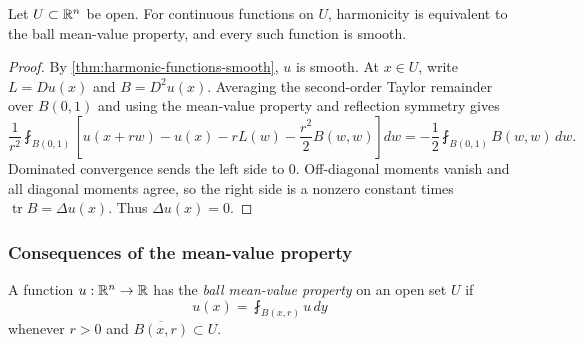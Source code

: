 \begin{theorem}
\label{thm:converse-mean-value-property-mvp}





Let $U\subset\mathbb{R}^n$ be open. For continuous functions on $U$, harmonicity is
equivalent to the ball mean-value property, and every such function is smooth.
\end{theorem}
\begin{proof}

\sketch By \cref{thm:harmonic-functions-smooth}, $u$ is smooth. At $x\in U$,
write $L=Du(x)$ and $B=D^2u(x)$. Averaging the second-order Taylor remainder
over $B(0,1)$ and using the mean-value property and reflection symmetry gives
$$\frac1{r^2}\fint_{B(0,1)}
\left[u(x+rw)-u(x)-rL(w)-\frac{r^2}{2}B(w,w)\right]dw
=-\frac12\fint_{B(0,1)}B(w,w)\,dw.$$
Dominated convergence sends the left side to $0$. Off-diagonal moments vanish
and all diagonal moments agree, so the right side is a nonzero constant times
$\operatorname{tr}B=\Delta u(x)$. Thus $\Delta u(x)=0$.
\end{proof}

\subsubsection{Consequences of the mean-value property}
\label{sec:laplace-mean-value-consequences}

\begin{definition}
\label{def:ball-mean-value-property}




A function $u:\mathbb{R}^n\to\mathbb{R}$ has the \emph{ball mean-value property} on an open
set $U$ if
$$u(x)=\fint_{B(x,r)}u\,dy$$
whenever $r>0$ and $\overline{B(x,r)}\subset U$.
\end{definition}

